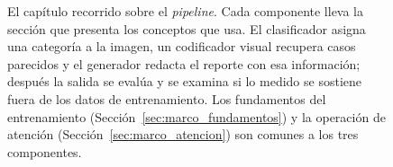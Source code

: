 \begin{figure}[H]
    \caption[El capítulo recorrido sobre el \emph{pipeline}]{El capítulo recorrido sobre el
    \emph{pipeline}. Cada componente lleva la sección que presenta los conceptos que usa. El clasificador
    asigna una categoría a la imagen, un codificador visual recupera casos parecidos y el generador redacta
    el reporte con esa información; después la salida se evalúa y se examina si lo medido se sostiene
    fuera de los datos de entrenamiento. Los fundamentos del entrenamiento
    (Sección~\ref{sec:marco_fundamentos}) y la operación de atención (Sección~\ref{sec:marco_atencion}) son
    comunes a los tres componentes.}
    \label{fig:marco_mapa}
\end{figure}
